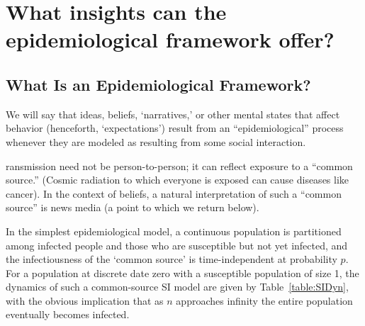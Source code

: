\section{What insights can the epidemiological framework
  offer?}\label{what-insights-can-the-epidemiological-framework-offer}

\subsection{What Is an Epidemiological Framework?}
\label{subsec:epi_framework}

We will say that ideas, beliefs, `narratives,' or other mental states that affect behavior (henceforth, `expectations') result from an ``epidemiological'' process whenever they are modeled as resulting from some social interaction.

ransmission need not be person-to-person; it can reflect exposure to a ``common source.''  (Cosmic radiation to which everyone is exposed can cause diseases like cancer).  %
In the context of beliefs, a natural interpretation of such a ``common source'' is news media (a point to which we return below).

In the simplest epidemiological model, a continuous population is partitioned among infected people {\Infected} and those who are susceptible {\Susceptible} but not yet infected, and the infectiousness of the `common source' is time-independent at probability $p$.  For a population at discrete date zero with a susceptible population of size 1, the dynamics of such a common-source SI model are given by Table~\ref{table:SIDyn}, with the obvious implication that as $n$ approaches infinity the entire population eventually becomes infected.

